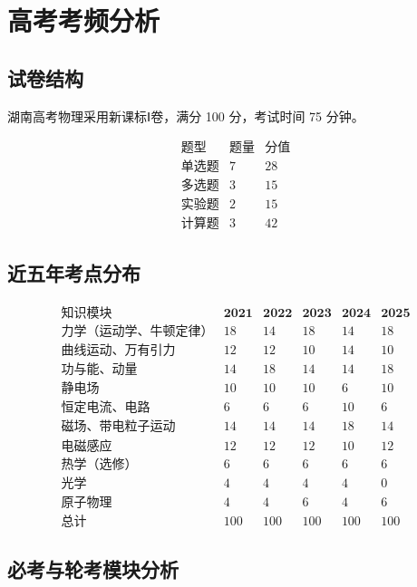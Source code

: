 \section{高考考频分析}

\subsection{试卷结构}

湖南高考物理采用新课标Ⅰ卷，满分 100 分，考试时间 75 分钟。

\[
\begin{array}{c|c|c}
\text{题型} & \text{题量} & \text{分值} \\ \hline
\text{单选题} & 7 & 28 \\
\text{多选题} & 3 & 15 \\
\text{实验题} & 2 & 15 \\
\text{计算题} & 3 & 42
\end{array}
\]

\subsection{近五年考点分布}

\[
\begin{array}{c|c|c|c|c|c}
\text{知识模块} & \textbf{2021} & \textbf{2022} & \textbf{2023} & \textbf{2024} & \textbf{2025} \\ \hline
\text{力学（运动学、牛顿定律）} & 18 & 14 & 18 & 14 & 18 \\
\text{曲线运动、万有引力} & 12 & 12 & 10 & 14 & 10 \\
\text{功与能、动量} & 14 & 18 & 14 & 14 & 18 \\
\text{静电场} & 10 & 10 & 10 & 6 & 10 \\
\text{恒定电流、电路} & 6 & 6 & 6 & 10 & 6 \\
\text{磁场、带电粒子运动} & 14 & 14 & 14 & 18 & 14 \\
\text{电磁感应} & 12 & 12 & 12 & 10 & 12 \\
\text{热学（选修）} & 6 & 6 & 6 & 6 & 6 \\
\text{光学} & 4 & 4 & 4 & 4 & 0 \\
\text{原子物理} & 4 & 4 & 6 & 4 & 6 \\ \hline
\text{总计} & 100 & 100 & 100 & 100 & 100
\end{array}
\]

\subsection{必考与轮考模块分析}

